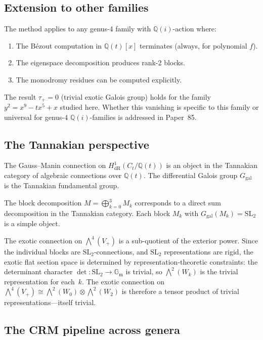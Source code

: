 \documentclass[11pt]{article}
\theoremstyle{plain}
\theoremstyle{definition}
\theoremstyle{remark}
\newcommand{\Q}{\mathbb{Q}}
\newcommand{\SL}{\mathrm{SL}}
\newcommand{\Ggal}{G_{\mathrm{gal}}}
\newcommand{\Gm}{\mathbb{G}_{\mathrm{m}}}
\newcommand{\HdR}{H^1_{\mathrm{dR}}}
\begin{document}
\subsection{Extension to other families}

The method applies to any genus-4 family with $\Q(i)$-action where:
\begin{enumerate}[nosep]
\item The B\'ezout computation in $\Q(t)[x]$ terminates (always, for
  polynomial $f$).
\item The eigenspace decomposition produces rank-2 blocks.
\item The monodromy residues can be computed explicitly.
\end{enumerate}

The result $\tau_+ = 0$ (trivial exotic Galois group) holds for the
family $y^2 = x^9 - tx^5 + x$ studied here. Whether this vanishing
is specific to this family or universal for genus-4 $\Q(i)$-families
is addressed in Paper~85.

\subsection{The Tannakian perspective}

The Gauss--Manin connection on $\HdR(C_t/\Q(t))$ is an object in the
Tannakian category of algebraic connections over $\Q(t)$. The
differential Galois group $\Ggal$ is the Tannakian fundamental group.

The block decomposition $M = \bigoplus_{k=0}^{3} M_k$ corresponds
to a direct sum decomposition in the Tannakian category. Each block
$M_k$ with $\Ggal(M_k) = \SL_2$ is a simple object.

The exotic connection on $\bigwedge^4(V_+)$ is a sub-quotient of
the exterior power. Since the individual blocks are $\SL_2$-connections,
and $\SL_2$ representations are rigid, the exotic flat section
space is determined by representation-theoretic constraints: the
determinant character $\det\colon \SL_2 \to \Gm$ is trivial, so
$\bigwedge^2(W_k)$ is the trivial representation for each~$k$. The
exotic connection on $\bigwedge^4(V_+) \cong \bigwedge^2(W_0) \otimes
\bigwedge^2(W_2)$ is therefore a tensor product of trivial
representations---itself trivial.

\subsection{The CRM pipeline across genera}
\end{document}
